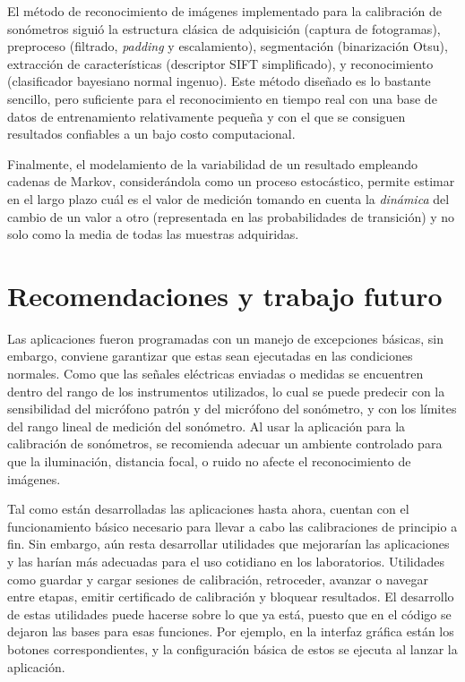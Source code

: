 El método de reconocimiento de imágenes implementado para la calibración de sonómetros siguió la estructura clásica de
adquisición (captura de fotogramas), preproceso (filtrado, \emph{padding} y escalamiento), segmentación
(binarización Otsu), extracción de características (descriptor SIFT simplificado), y reconocimiento (clasificador
bayesiano normal ingenuo).
Este método diseñado es lo bastante sencillo, pero suficiente para el reconocimiento en tiempo real con una base de datos
de entrenamiento relativamente pequeña y con el que se consiguen resultados confiables a un bajo costo computacional.

Finalmente, el modelamiento de la variabilidad de un resultado empleando cadenas de Markov, considerándola como un proceso
estocástico, permite estimar en el largo plazo cuál es el valor de medición tomando en cuenta la \emph{dinámica} del
cambio de un valor a otro (representada en las probabilidades de transición) y no solo como la media de todas las
muestras adquiridas.

\section{Recomendaciones y trabajo futuro}
Las aplicaciones fueron programadas con un manejo de excepciones básicas, sin embargo, conviene garantizar que estas
sean ejecutadas en las condiciones normales.
Como que las señales eléctricas enviadas o medidas se encuentren dentro del rango de los instrumentos utilizados,
lo cual se puede predecir con la sensibilidad del micrófono patrón y del micrófono del sonómetro, y con los límites
del rango lineal de medición del sonómetro.
Al usar la aplicación para la calibración de sonómetros, se recomienda adecuar un ambiente controlado para que la
iluminación, distancia focal, o ruido no afecte el reconocimiento de imágenes.

Tal como están desarrolladas las aplicaciones hasta ahora, cuentan con el funcionamiento básico necesario para llevar a
cabo las calibraciones de principio a fin.
Sin embargo, aún resta desarrollar utilidades que mejorarían las aplicaciones y las harían más adecuadas para el uso
cotidiano en los laboratorios.
Utilidades como guardar y cargar sesiones de calibración, retroceder, avanzar o navegar entre etapas, emitir certificado
de calibración y bloquear resultados.
El desarrollo de estas utilidades puede hacerse sobre lo que ya está, puesto que en el código se dejaron las bases para
esas funciones.
Por ejemplo, en la interfaz gráfica están los botones correspondientes, y la configuración básica de estos se ejecuta al
lanzar la aplicación.

